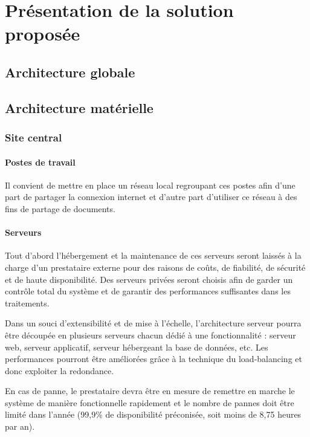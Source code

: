 \documentclass[a4paper]{article}
\begin{document}
\section{Présentation de la solution proposée}

\subsection{Architecture globale}

\subsection{Architecture matérielle}

\subsubsection{Site central}

\paragraph{Postes de travail} Il convient de mettre en place un réseau local regroupant ces postes afin d'une part de partager la connexion internet et d'autre part d'utiliser ce réseau à des fins de partage de documents.

\paragraph{Serveurs}

Tout d'abord l'hébergement et la maintenance de ces serveurs seront laissés à la charge d'un prestataire externe pour des raisons de coûts, de fiabilité, de sécurité et de haute disponibilité. Des serveurs privées seront choisis afin de garder un contrôle total du système et de garantir des performances suffisantes dans les traitements.

Dans un souci d'extensibilité et de mise à l'échelle, l'architecture serveur pourra être découpée en plusieurs serveurs chacun dédié à une fonctionnalité : serveur web, serveur applicatif, serveur hébergeant la base de données, etc. Les performances pourront être améliorées grâce à la technique du load-balancing et donc exploiter la redondance.

En cas de panne, le prestataire devra être en mesure de remettre en marche le système de manière fonctionnelle rapidement et le nombre de pannes doit être limité dans l'année (99,9\% de disponibilité préconisée, soit moins de 8,75 heures par an).
\end{document}
